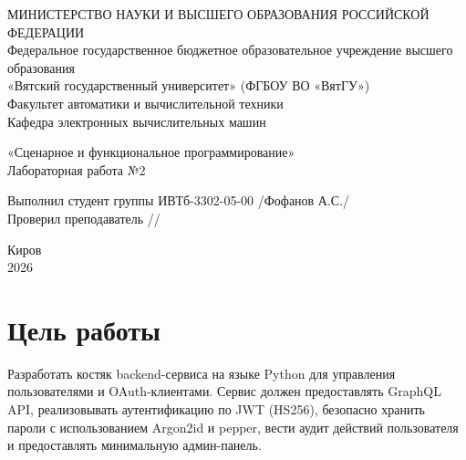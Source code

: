 \documentclass[oneside,a4paper,14pt]{extarticle}
\begin{document}
\pagestyle{empty}
\begin{center}
    {МИНИСТЕРСТВО НАУКИ И ВЫСШЕГО ОБРАЗОВАНИЯ РОССИЙСКОЙ ФЕДЕРАЦИИ \\
    Федеральное государственное бюджетное образовательное учреждение высшего образования \\
    «Вятский государственный университет» (ФГБОУ ВО «ВятГУ») \\
    Факультет автоматики и вычислительной техники \\
    Кафедра электронных вычислительных машин \\ }

    \vspace*{35mm}

    {«Сценарное и функциональное программирование» \\
    Лабораторная работа №2 \\ }
\end{center}

\vspace*{35mm}
       Выполнил студент группы ИВТб-3302-05-00 \hspace*{1mm} \underline{\hspace{10mm}} /Фофанов А.С./  \\
       \hspace*{12mm}Проверил преподаватель \hspace*{44mm} \underline{\hspace{10mm}} /\hspace{30mm}/ \\

\begin{center}
    \vspace*{35mm}
    \large{Киров \\
    2026}
\end{center}

\newpage
\pagestyle{plain}
\setcounter{page}{2}
\normalsize

\section*{Цель работы}
Разработать костяк backend-сервиса на языке Python для управления пользователями и OAuth-клиентами. Сервис должен предоставлять GraphQL API, реализовывать аутентификацию по JWT (HS256), безопасно хранить пароли с использованием Argon2id и pepper, вести аудит действий пользователя и предоставлять минимальную админ-панель.
\end{document}

